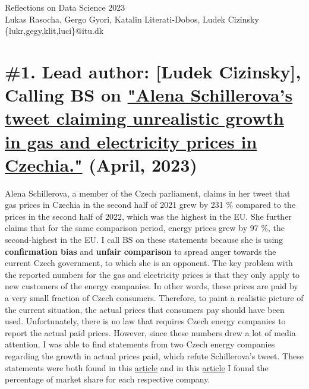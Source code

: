 \documentclass[fleqn,12pt]{article}
\begin{document}
\setlength{\baselineskip}{1.15\baselineskip}



\begin{center}
  {\Huge Reflections on Data Science 2023}\\[2ex]
  {Lukas Rasocha, Gergo Gyori, Katalin Literati-Dobos, Ludek Cizinsky}\\
  [2ex]
  {\{lukr,gegy,klit,luci\}@itu.dk}\\[2ex]
\end{center}

\tableofcontents


\parindent=20pt 
\parskip=0mm
\newpage

\section{\#1. Lead author: [Ludek Cizinsky], Calling BS on \href{https://twitter.com/alenaschillerov/status/1651167356687732736?s=20}{"Alena Schillerova's tweet claiming unrealistic growth in gas and electricity prices in Czechia."} (April, 2023)} 
Alena Schillerova, a member of the Czech parliament, claims in her tweet that gas prices in Czechia in the second half of 2021 grew by 231 \% compared to the prices 
in the second half of 2022, which was the highest in the EU. She further claims that for the same comparison period, energy prices grew by 97 \%, 
the second-highest in the EU. I call BS on these statements because she is using \textbf{confirmation bias} and \textbf{unfair comparison} to spread anger towards the current 
Czech government, to which she is an opponent. The key problem with the reported numbers for the gas and electricity prices is that they only apply to new customers of the 
energy companies. In other words, these prices are paid by a very small fraction of Czech consumers. 
Therefore, to paint a realistic picture of the current situation, the actual prices that consumers pay should have been used. 
Unfortunately, there is no law that requires Czech energy companies to report the actual paid prices. 
However, since these numbers drew a lot of media attention, I was able to find statements from two Czech energy companies regarding the growth in actual prices paid, which refute Schillerova's tweet. 
These statements were both found in this \href{https://www.idnes.cz/ekonomika/domaci/cena-plyn-cesko-lonsky-rust-eurostat.A230426_124224_ekonomika_vebe}{article} and in 
this \href{https://ekonomickydenik.cz/cez-a-innogy-posiluji-podil-na-proridlem-trhu-s-elektrinou-a-plynem/}{article} I found the percentage of market share for each 
respective company.
\end{document}
